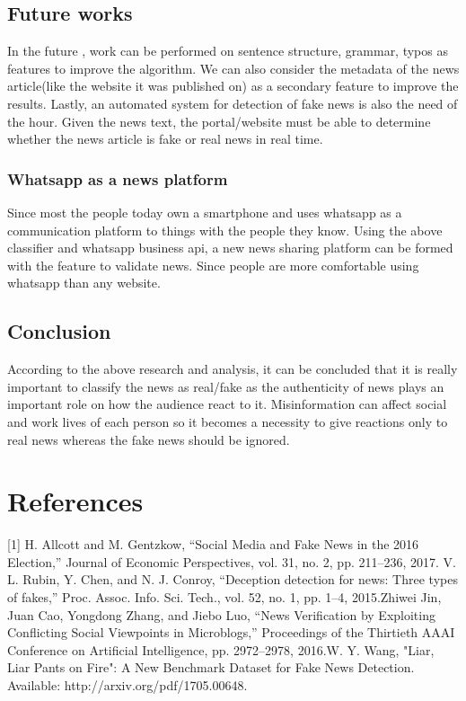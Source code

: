 \documentclass[runningheads]{llncs}
\begin{document}
\subsection{Future works}
In the future , work can be performed on sentence structure, grammar, typos as features to improve the algorithm. We can also consider the metadata of the news article(like the website it was published on) as a secondary feature to improve the results. Lastly, an automated system for detection of fake news is also the need of the hour. Given the news text, the portal/website must be able to determine whether the news article is fake or real news in real time.

\subsubsection{Whatsapp as a news platform}
Since most the people today own a smartphone and uses whatsapp as a communication platform to things with the people they know. Using the above classifier and whatsapp business api, a new news sharing platform can be formed with the feature to validate news. Since people are more comfortable using whatsapp than any website.

\subsection{Conclusion}
According to the above research and analysis, it can be concluded that it is really important to classify the news as real/fake as the authenticity of news plays an important role on how the audience react to it. Misinformation can affect social and work lives of each person so it becomes a necessity to give reactions only to real news whereas the fake news should be ignored. 
\newline

\section{References}
[1] H. Allcott and M. Gentzkow, “Social Media and Fake News in the 2016 Election,” Journal of Economic Perspectives, vol. 31, no. 2, pp. 211–236, 2017. \newline\newline
[2] V. L. Rubin, Y. Chen, and N. J. Conroy, “Deception detection for news: Three types of fakes,” Proc. Assoc. Info. Sci. Tech., vol. 52, no. 1, pp. 1–4, 2015.\newline\newline
[3] Zhiwei Jin, Juan Cao, Yongdong Zhang, and Jiebo Luo, “News Verification by Exploiting Conflicting Social Viewpoints in Microblogs,” Proceedings of the Thirtieth AAAI Conference on Artificial Intelligence, pp. 2972–2978, 2016.\newline\newline
[4] W. Y. Wang, "Liar, Liar Pants on Fire": A New Benchmark Dataset for Fake News Detection. Available: http://arxiv.org/pdf/1705.00648. \newline \newline

\newpage


%
\end{document}
